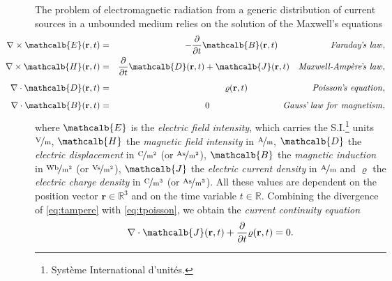 \par The problem of electromagnetic radiation from a generic distribution of current sources in a unbounded medium relies on the solution of the Maxwell's equations \cite{rothwell2009electromagnetics}
\begin{eqnarray}
\hspace{-1.2cm}\nabla \times \mathcalb{E}(\mathbf{r},t) &= & -\frac{\partial}{\partial t}\mathcalb{B}(\mathbf{r},t) \qquad \qquad \qquad  \mathit{Faraday}\textrm{'}\mathit{\!s \ law}, \label{eq:tfaraday}  \\
\hspace{-1.2cm}\nabla \times \mathcalb{H}(\mathbf{r},t) &= & \frac{\partial}{\partial t}\mathcalb{D}(\mathbf{r},t) + \mathcalb{J}(\mathbf{r},t)   \ \ \ \textit{Maxwell-Amp\`{e}re}\textrm{'}\mathit{\!s \ law}, \label{eq:tampere} \\[5pt]
\hspace{-1.2cm}\nabla \cdot \mathcalb{D}(\mathbf{r},t) &= & {\varrho}(\mathbf{r},t) \qquad \qquad \qquad \quad \  \mathit{Poisson}\textrm{'}\mathit{\!s \ equation}, \label{eq:tpoisson}\\[5pt]
\hspace{-1.2cm}\nabla \cdot \mathcalb{B}(\mathbf{r},t) &= & 0 \qquad \qquad \qquad \quad \ \ \ \ \mathit{Gauss}\textrm{'}\mathit{\! \ law \ for \ magnetism}, \label{eq:tgauss}
\end{eqnarray} where $\mathcalb{E}$ is the \textit{electric field intensity}, which carries the S.I.\footnote{Syst\`eme International d'unit\'es.} units $\mathrm{\nicefrac{\mathrm V}{\mathrm m}}$, $\mathcalb{H}$ the \textit{magnetic field intensity} in $\mathrm{\nicefrac{\mathrm A}{\mathrm m}}$, $\mathcalb{D}$ the \textit{electric displacement} in $\mathrm{\nicefrac{\mathrm C}{m^2}}$ (or $\mathrm{\nicefrac{\mathrm{As}}{m^2}}$), $\mathcalb{B}$ the \textit{magnetic induction} in $\mathrm{\nicefrac{\mathrm{Wb}}{m^2}}$ (or $\mathrm{\nicefrac{\mathrm{Vs}}{m^2}}$), $\mathcalb{J}$ the \textit{electric current density} in $\mathrm{\nicefrac{\mathrm A}{\mathrm m}}$ and $\mathcal{\varrho}$ the \textit{electric charge density} in $\mathrm{\nicefrac{\mathrm C}{m^3}}$ (or $\mathrm{\nicefrac{\mathrm{As}}{m^3}}$).
 All these values are dependent on the position vector $\mathbf{r} \in \mathbb{R}^3$ and on the time variable $t \in \mathbb{R}$. Combining the divergence of \eqref{eq:tampere} with \eqref{eq:tpoisson}, we obtain the \textit{current continuity equation}
\begin{equation}
\nabla \cdot \mathcalb{J}(\mathbf{r},t) + \frac{\partial}{\partial t} \mathcal{\varrho}(\mathbf{r},t) = 0.
\end{equation}
